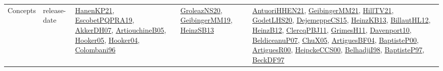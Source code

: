 {\begin{longtable}{lp{3cm}>{\raggedright}p{6cm}>{\raggedright}p{6cm}p{8cm}}
Concepts & release-date & \href{papers/HanenKP21.pdf}{HanenKP21}\cite{HanenKP21}, \href{articles/EscobetPQPRA19.pdf}{EscobetPQPRA19}\cite{EscobetPQPRA19}, \href{papers/AkkerDH07.pdf}{AkkerDH07}\cite{AkkerDH07}, \href{papers/ArtiouchineB05.pdf}{ArtiouchineB05}\cite{ArtiouchineB05}, \href{articles/Hooker05.pdf}{Hooker05}\cite{Hooker05}, \href{papers/Hooker04.pdf}{Hooker04}\cite{Hooker04}, \href{papers/Colombani96.pdf}{Colombani96}\cite{Colombani96} & \href{papers/GroleazNS20.pdf}{GroleazNS20}\cite{GroleazNS20}, \href{papers/GeibingerMM19.pdf}{GeibingerMM19}\cite{GeibingerMM19}, \href{articles/HeinzSB13.pdf}{HeinzSB13}\cite{HeinzSB13} & \href{papers/AntuoriHHEN21.pdf}{AntuoriHHEN21}\cite{AntuoriHHEN21}, \href{papers/GeibingerMM21.pdf}{GeibingerMM21}\cite{GeibingerMM21}, \href{papers/HillTV21.pdf}{HillTV21}\cite{HillTV21}, \href{papers/GodetLHS20.pdf}{GodetLHS20}\cite{GodetLHS20}, \href{papers/DejemeppeCS15.pdf}{DejemeppeCS15}\cite{DejemeppeCS15}, \href{papers/HeinzKB13.pdf}{HeinzKB13}\cite{HeinzKB13}, \href{papers/BillautHL12.pdf}{BillautHL12}\cite{BillautHL12}, \href{papers/HeinzB12.pdf}{HeinzB12}\cite{HeinzB12}, \href{papers/ClercqPBJ11.pdf}{ClercqPBJ11}\cite{ClercqPBJ11}, \href{papers/GrimesH11.pdf}{GrimesH11}\cite{GrimesH11}, \href{papers/Davenport10.pdf}{Davenport10}\cite{Davenport10}, \href{papers/BeldiceanuP07.pdf}{BeldiceanuP07}\cite{BeldiceanuP07}, \href{papers/ChuX05.pdf}{ChuX05}\cite{ChuX05}, \href{papers/ArtiguesBF04.pdf}{ArtiguesBF04}\cite{ArtiguesBF04}, \href{articles/BaptisteP00.pdf}{BaptisteP00}\cite{BaptisteP00}, \href{articles/ArtiguesR00.pdf}{ArtiguesR00}\cite{ArtiguesR00}, \href{articles/HeipckeCCS00.pdf}{HeipckeCCS00}\cite{HeipckeCCS00}, \href{articles/BelhadjiI98.pdf}{BelhadjiI98}\cite{BelhadjiI98}, \href{papers/BaptisteP97.pdf}{BaptisteP97}\cite{BaptisteP97}, \href{papers/BeckDF97.pdf}{BeckDF97}\cite{BeckDF97}\\

\end{longtable}}
